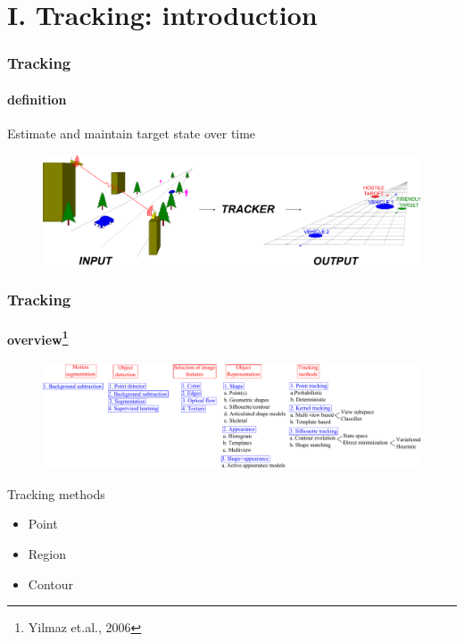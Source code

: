 \section{I. Tracking: introduction}
\begin{frame}
\frametitle{Tracking}
\framesubtitle{definition}
\logoCSIPCPL\mypagenum
	Estimate and maintain {\color{red}target state} over {\color{red}time}
	\begin{figure}
		\includegraphics[width=1.0\textwidth]{thesis/TRK_overviewDiagram.pdf}
	\end{figure}
\end{frame}


\begin{frame}[plain]
\frametitle{Tracking}
\framesubtitle{overview\tiny{\footnote {Yilmaz et.al., 2006}}}
\logoCSIPCPL\mypagenum
	\begin{changemargin}{-1.3in}{0in}
		\begin{figure}
			\includegraphics[width=1.3\textwidth]{thesis/TRK_overview.pdf}
		\end{figure}	
	\end{changemargin}
	\begin{block}{Tracking methods}
		\begin{itemize}
			\item Point
			\item Region
			\item Contour
		\end{itemize}
	\end{block}
\end{frame}



